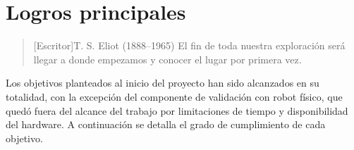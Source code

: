 \chapter{Logros principales}

\begin{quotation}[Escritor]{T. S. Eliot (1888--1965)}
El fin de toda nuestra exploración será llegar a donde empezamos y conocer el lugar por primera vez.
\end{quotation}

\begin{abstract}
Este capítulo recoge los logros alcanzados a lo largo del proyecto, contrastándolos con los objetivos definidos al inicio del trabajo. Se evalúa el grado de cumplimiento de cada objetivo y se destacan los resultados más relevantes obtenidos.
\end{abstract}

Los objetivos planteados al inicio del proyecto han sido alcanzados en su totalidad, con la excepción del componente de validación con robot físico, que quedó fuera del alcance del trabajo por limitaciones de tiempo y disponibilidad del hardware. A continuación se detalla el grado de cumplimiento de cada objetivo.

